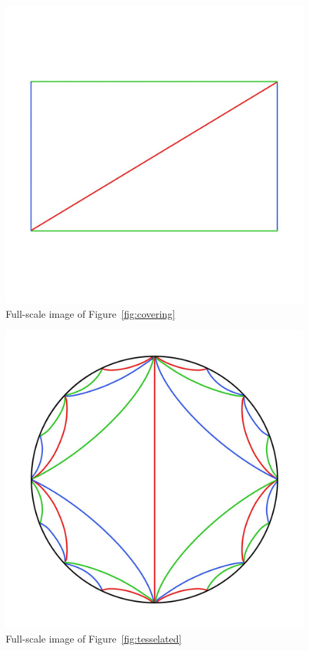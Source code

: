 \documentclass[12pt,a4paper,reqno,parskip=full]{amsart}
\numberwithin{equation}{section}
\theoremstyle{plain}
\theoremstyle{definition}
\begin{document}
\begin{figure}[H]
    \centering
    \includegraphics[width=\textwidth]{images/Universal Covering.jpg}
    \caption{Full-scale image of Figure~\ref{fig:covering}}
\end{figure}

\begin{figure}[H]
    \centering
    \includegraphics[width=\textwidth]{images/RS colored detailed.jpg}
    \caption{Full-scale image of Figure~\ref{fig:tesselated}}
\end{figure}
\end{document}
